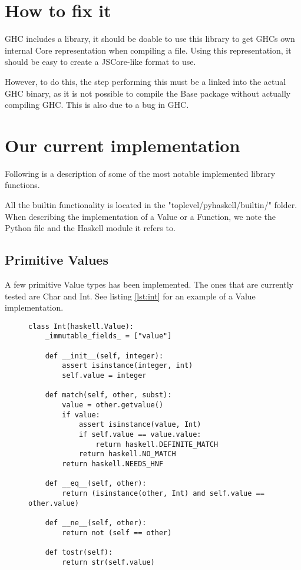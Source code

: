 \section{How to fix it}


GHC includes a library, it should be doable to use this library to get
GHCs own internal Core representation when compiling a file. Using this 
representation, it should be easy to create a JSCore-like format to use.

However, to do this, the step performing this must be a linked into the
actual GHC binary, as it is not possible to compile the Base package without
actually compiling GHC. This is also due to a bug in GHC.

\section{Our current implementation}



Following is a description of some of the most notable implemented library 
functions.

All the builtin functionality is located in the "toplevel/pyhaskell/builtin/"
folder. When describing the implementation of a Value or a Function, we note
the Python file and the Haskell module it refers to.

\subsection{Primitive Values}

A few primitive Value types has been implemented. The ones that are currently
tested are Char and Int. See listing \ref{lst:int} for an example of a 
Value implementation. 


\begin{figure}[H]
\lstset{ %
language=Python,
caption=Python class implementing the Haskell Int Value.,
label=lst:int
}
\begin{lstlisting}
class Int(haskell.Value):
    _immutable_fields_ = ["value"]

    def __init__(self, integer):
        assert isinstance(integer, int)
        self.value = integer

    def match(self, other, subst):
        value = other.getvalue()
        if value:
            assert isinstance(value, Int)
            if self.value == value.value:
                return haskell.DEFINITE_MATCH
            return haskell.NO_MATCH
        return haskell.NEEDS_HNF

    def __eq__(self, other):
        return (isinstance(other, Int) and self.value == other.value)

    def __ne__(self, other):
        return not (self == other)

    def tostr(self):
        return str(self.value)
\end{lstlisting}
\end{figure}

